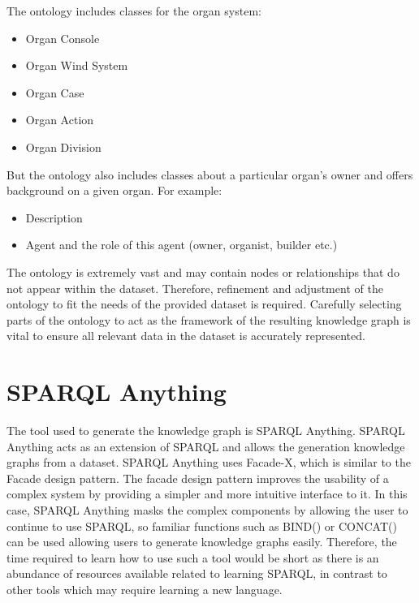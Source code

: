 The ontology includes classes for the organ system:

\vspace{-0.15cm}
\begin{itemize}
    \itemsep0em 
\item Organ Console
\vspace{-0.1cm}
\item Organ Wind System
\vspace{-0.1cm}
\item Organ Case
\vspace{-0.1cm}
\item Organ Action
\vspace{-0.1cm}
\item Organ Division
\end{itemize}
\vspace{-0.15cm}

\noindent But the ontology also includes classes about a particular organ's owner and offers background on a given organ. For example:

\vspace{-0.15cm}
\begin{itemize}
    \itemsep0em 
\item Description
\vspace{-0.1cm}
\item Agent and the role of this agent (owner, organist, builder etc.)
\end{itemize}
\vspace{-0.15cm}

The ontology is extremely vast and may contain nodes or relationships that do not appear within the dataset. Therefore, refinement and adjustment of the ontology to fit the needs of the provided dataset is required. Carefully selecting parts of the ontology to act as the framework of the resulting knowledge graph is vital to ensure all relevant data in the dataset is accurately represented. 

\section{SPARQL Anything}
\hspace{0.5cm} The tool used to generate the knowledge graph is SPARQL Anything. SPARQL Anything acts as an extension of SPARQL and allows the generation knowledge graphs from a dataset. SPARQL Anything uses Facade-X, which is similar to the Facade design pattern. The facade design pattern improves the usability of a complex system by providing a simpler and more intuitive interface to it. In this case, SPARQL Anything masks the complex components by allowing the user to continue to use SPARQL, so familiar functions such as BIND() or CONCAT() can be used allowing users to generate knowledge graphs easily. Therefore, the time required to learn how to use such a tool would be short as there is an abundance of resources available related to learning SPARQL, in contrast to other tools which may require learning a new language. 

